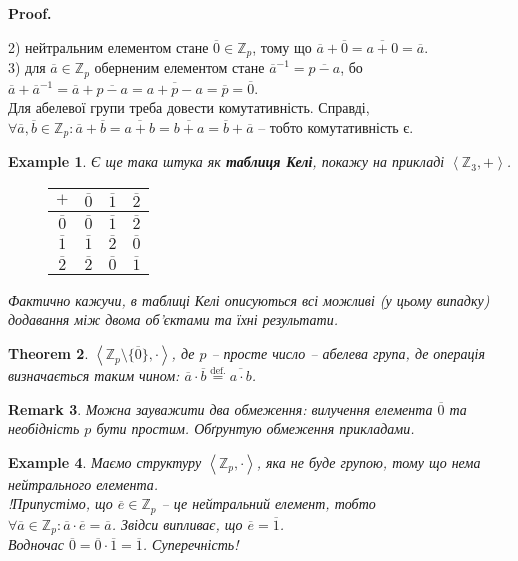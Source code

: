 \documentclass[a4paper, 10pt]{article}
\makeatletter
\theoremstyle{theoremdd}
\newtheorem{theorem}{Theorem}[subsection]
\theoremstyle{theoremdd}
\theoremstyle{theoremdd}
\theoremstyle{theoremdd}
\theoremstyle{theoremdd}
\newtheorem{example}[theorem]{Example}
\theoremstyle{theoremdd}
\theoremstyle{theoremdd}
\theoremstyle{theoremdd}
\theoremstyle{theoremdd}
\theoremstyle{theoremdd}
\theoremstyle{theoremdd}
\newtheorem{remark}[theorem]{Remark}
\theoremstyle{theoremdd}
\theoremstyle{theoremdd}
\theoremstyle{theoremdd}
\theoremstyle{theoremdd}
\renewenvironment{proof}[1][Proof.\\]{\par
\pushQED{\hfill \qed}%
\normalfont \topsep6\p@\@plus6\p@\relax
\trivlist
\item\relax
{\bfseries
#1\@addpunct{.}}\hspace\labelsep\ignorespaces
}{%
\popQED\endtrivlist\@endpefalse
}
\makeatother
\begin{document}
\begin{proof}
2) нейтральним елементом стане $\overline{0} \in \mathbb{Z}_p$, тому що $\overline{a} + \overline{0} = \overline{a+0} = \overline{a}$.\\
3) для $\overline{a} \in \mathbb{Z}_p$ оберненим елементом стане $\overline{a}^{-1} = \overline{p-a}$, бо $\overline{a} + \overline{a}^{-1} = \overline{a} + \overline{p-a} = \overline{a+p-a} = \overline{p} = \overline{0}$.\\
Для абелевої групи треба довести комутативність. Справді,\\
$\forall \overline{a},\overline{b} \in \mathbb{Z}_p: \overline{a} + \overline{b} = \overline{a+b} = \overline{b+a} = \overline{b} + \overline{a}$ -- тобто комутативність є.
\end{proof}

\begin{example}
Є ще така штука як \textbf{таблиця Келі}, покажу на прикладі $\left<\mathbb{Z}_3,+ \right>$.
\begin{figure}[H]
\centering
\begin{tabular}{c|ccc}
$+$ & $\overline{0}$ & $\overline{1}$ & $\overline{2}$ \\
\hline
$\overline{0}$ & $\overline{0}$ & $\overline{1}$ & $\overline{2}$ \\
$\overline{1}$ & $\overline{1}$ & $\overline{2}$ & $\overline{0}$ \\
$\overline{2}$ & $\overline{2}$ & $\overline{0}$ & $\overline{1}$ \\
\end{tabular}
\end{figure}
Фактично кажучи, в таблиці Келі описуються всі можливі (у цьому випадку) додавання між двома об'єктами та їхні результати.
\end{example}

\begin{theorem}
\label{multiplicative_class_of_residues_mod_n_is_a_group}
$\left< \mathbb{Z}_p \setminus \{\overline{0}\}, \cdot \right>$, де $p$ -- просте число -- абелева група, де операція визначається таким чином: $\overline{a} \cdot \overline{b} \overset{\text{def.}}{=} \overline{a \cdot b}$.
\end{theorem}

\begin{remark}
Можна зауважити два обмеження: вилучення елемента $\overline{0}$ та необідність $p$ бути простим. Обґрунтую обмеження прикладами.
\end{remark}

\begin{example}
Маємо структуру $\left< \mathbb{Z}_p, \cdot \right>$, яка не буде групою, тому що нема нейтрального елемента.\\
!Припустімо, що $\overline{e} \in \mathbb{Z}_p$ -- це нейтральний елемент, тобто \\ $\forall \overline{a} \in \mathbb{Z}_p: \overline{a} \cdot \overline{e} = \overline{a}$. Звідси випливає, що $\overline{e} = \overline{1}$.\\
Водночас $\overline{0} = \overline{0} \cdot \overline{1} = \overline{1}$. Суперечність!
\end{example}
\end{document}
